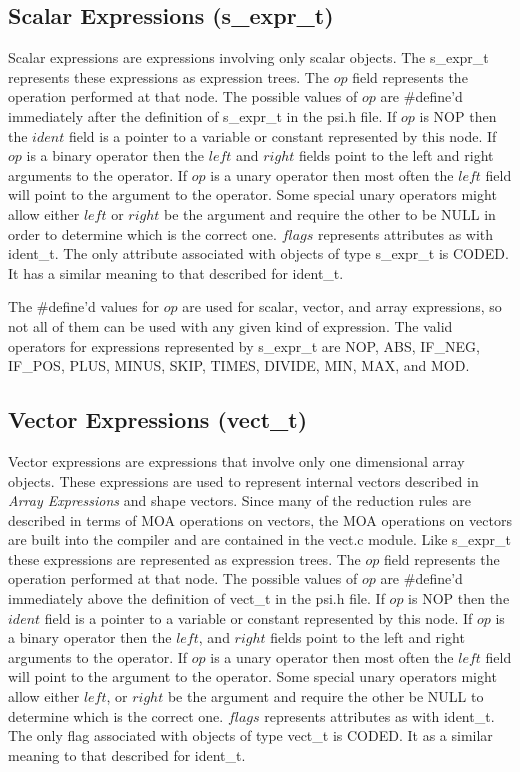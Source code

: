 \subsection{Scalar Expressions (s\_expr\_t)}
Scalar expressions are expressions involving only scalar objects.  The
s\_expr\_t represents these expressions as expression trees.  The $op$
field represents the operation performed at that node.  The possible values
of $op$ are \#define'd immediately after the definition of s\_expr\_t in
the psi.h file.  If $op$ is NOP then the $ident$ field is a pointer to a 
variable or constant represented by this node.  If $op$ is a binary operator
then the $left$ and $right$ fields point to the left and right arguments
to the operator.  If $op$ is a unary operator then most often the $left$
field will point to the argument to the operator.  Some special unary operators
might allow either $left$ or $right$ be the argument and require the other to
be NULL in order to determine which is the correct one.  $flags$ represents 
attributes as with ident\_t.  The only attribute associated with objects of 
type s\_expr\_t
is CODED.  It has a similar meaning to that described for ident\_t.

The \#define'd values for $op$ are used for scalar, vector, and array 
expressions, so not all of them can be used with any given kind of expression.
The valid operators for expressions represented by s\_expr\_t are
NOP, ABS, IF\_NEG, IF\_POS, PLUS, MINUS, SKIP, TIMES, DIVIDE, MIN, MAX,
and MOD.

\subsection{Vector Expressions (vect\_t)}
Vector expressions are expressions that involve only one dimensional array
objects.  These expressions are used to represent internal vectors described in
{\it Array Expressions} and shape vectors.  Since many of the reduction rules
are described in terms of MOA operations on vectors, the MOA operations on 
vectors are built into the compiler and are contained in the vect.c module.
Like s\_expr\_t these expressions are represented as expression trees.  The 
$op$ field represents the operation performed at that node.  The possible 
values of $op$ are \#define'd immediately above the definition of vect\_t in
the psi.h file.  If $op$ is NOP then the $ident$ field is a pointer to a 
variable or constant represented by this node.  If $op$ is a binary operator
then the $left$, and $right$ fields point to the left and right arguments
to the operator.  If $op$ is a unary operator then most often the $left$
field will point to the argument to the operator.  Some special unary operators
might allow either $left$, or $right$ be the argument and require the other
be NULL to determine which is the correct one.  $flags$ represents attributes
as with ident\_t.  The only flag associated with objects of type vect\_t
is CODED.  It as a similar meaning to that described for ident\_t.


